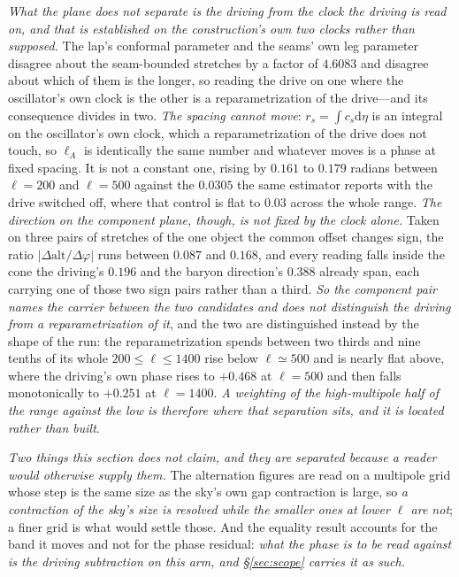 \documentclass[11pt,a4paper]{article}
\theoremstyle{plain}
\theoremstyle{definition}
\theoremstyle{remark}
\newcommand{\dd}{\mathrm{d}}   %
\begin{document}
\emph{What the plane does not separate is the driving from the clock the driving is read on, and that
is established on the construction's own two clocks rather than supposed.} The lap's conformal
parameter and the seams' own leg parameter disagree about the seam-bounded stretches by a factor of
$4.6083$ and disagree about which of them is the longer, so reading the drive on one where the
oscillator's own clock is the other is a reparametrization of the drive---and its consequence divides
in two. \emph{The spacing cannot move}: $r_{s}=\int c_{s}\dd\eta$ is an integral on the oscillator's
own clock, which a reparametrization of the drive does not touch, so $\ell_{A}$ is identically the
same number and whatever moves is a phase at fixed spacing. It is not a constant one, rising by
$0.161$ to $0.179$ radians between $\ell=200$ and $\ell=500$ against the $0.0305$ the same estimator
reports with the drive switched off, where that control is flat to $0.03$ across the whole range.
\emph{The direction on the component plane, though, is not fixed by the clock alone.} Taken on three
pairs of stretches of the one object the common offset changes sign, the ratio
$\lvert\Delta\mathrm{alt}/\Delta\varphi\rvert$ runs between $0.087$ and $0.168$, and every reading
falls inside the cone the driving's $0.196$ and the baryon direction's $0.388$ already span, each
carrying one of those two sign pairs rather than a third. \emph{So the component pair names the
carrier between the two candidates and does not distinguish the driving from a reparametrization of
it}, and the two are distinguished instead by the shape of the run: the reparametrization spends
between two thirds and nine tenths of its whole $200\le\ell\le1400$ rise below $\ell\simeq500$ and is
nearly flat above, where the driving's own phase rises to $+0.468$ at $\ell=500$ and then falls
monotonically to $+0.251$ at $\ell=1400$. \emph{A weighting of the high-multipole half of the range
against the low is therefore where that separation sits, and it is located rather than
built}.

\emph{Two things this section does not claim, and they are separated because a reader would otherwise
supply them.} The alternation figures are read on a multipole grid whose step is the same size as the
sky's own gap contraction is large, so \emph{a contraction of the sky's size is resolved while the smaller
ones at lower $\ell$ are not}; a finer
grid is what would settle those. And the equality result accounts for the band it moves and not for the phase
residual: \emph{what the phase is to be read against is the driving subtraction on this arm, and
\S\ref{sec:scope} carries it as such.}
\end{document}
